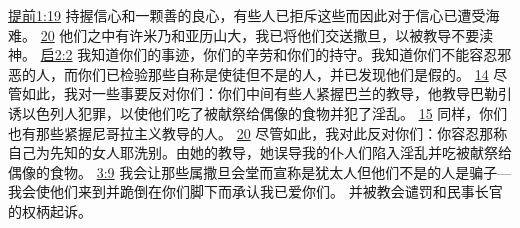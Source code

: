 \documentclass[12pt, a4paper, oneside]{ctexart}
\begin{document}
{		\href{https://biblehub.com/1_timothy/1-19.htm}{提前1:19} 持握信心和一颗善的良心，有些人已拒斥这些而因此对于信心已遭受海难。
		\href{https://biblehub.com/1_timothy/1-20.htm}{20} 他们之中有许米乃和亚历山大，我已将他们交送撒旦，以被教导不要渎神。
		\href{https://biblehub.com/revelation/2-2.htm}{启2:2} 我知道你们的事迹，你们的辛劳和你们的持守。我知道你们不能容忍邪恶的人，而你们已检验那些自称是使徒但不是的人，并已发现他们是假的。
		\href{https://biblehub.com/revelation/2-14.htm}{14} 尽管如此，我对一些事要反对你们：你们中间有些人紧握巴兰的教导，他教导巴勒引诱以色列人犯罪，以使他们吃了被献祭给偶像的食物并犯了淫乱。
		\href{https://biblehub.com/revelation/2-15.htm}{15} 同样，你们也有那些紧握尼哥拉主义教导的人。
		\href{https://biblehub.com/revelation/2-20.htm}{20} 尽管如此，我对此反对你们：你容忍那称自己为先知的女人耶洗别。由她的教导，她误导我的仆人们陷入淫乱并吃被献祭给偶像的食物。
		\href{https://biblehub.com/revelation/3-9.htm}{3:9} 我会让那些属撒旦会堂而宣称是犹太人但他们不是的人是骗子---我会使他们来到并跪倒在你们脚下而承认我已爱你们。
	}
	并被教会谴罚和民事长官的权柄起诉。
\end{document}
